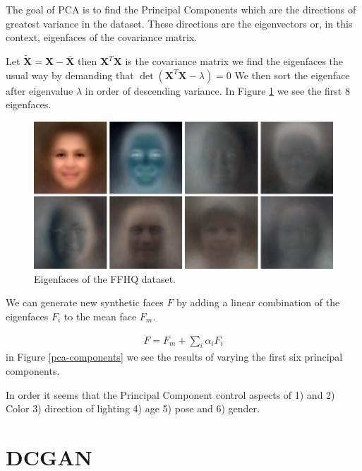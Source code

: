 The goal of PCA is to find the Principal Components which are the directions of greatest variance in the dataset. These directions are the eigenvectors or, in this context, eigenfaces of the covariance matrix.

Let $\tilde{\mathbf{X}} = \mathbf{X} - \bar{\mathbf{X}}$ then $\mathbf{X}^T\mathbf{X}$ is the covariance matrix we find the eigenfaces the usual way by demanding that $\det(\mathbf{X}^T\mathbf{X} - \lambda) = 0$
We then sort the eigenface after eigenvalue $\lambda$ in order of descending variance. In Figure \ref{eigenface} we see the first 8 eigenfaces.

\begin{figure}
  \includegraphics[width=\textwidth]{fig/PCA/pca}
  \caption{Eigenfaces of the FFHQ dataset.}
  \label{eigenface}
\end{figure}

We can generate new synthetic faces $F$ by adding a linear combination of the
eigenfaces $F_i$ to the mean face $F_m$.

\begin{align}
F  = F_m + \sum_{i} \alpha_i F_i
\end{align}
in Figure \ref{pca-components} we see the results of varying the first six
principal components.

In order it seems that the Principal Component control aspects of 1) and 2) Color 3) direction of lighting 4) age 5) pose and 6) gender.



\section{DCGAN}








